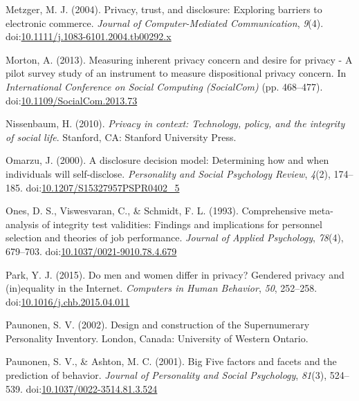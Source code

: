 \documentclass[man,floatsintext]{apa6}
\begin{document}
\leavevmode\hypertarget{ref-Metzger.2004}{}%
Metzger, M. J. (2004). Privacy, trust, and disclosure: Exploring barriers to electronic commerce. \emph{Journal of Computer-Mediated Communication}, \emph{9}(4). doi:\href{https://doi.org/10.1111/j.1083-6101.2004.tb00292.x}{10.1111/j.1083-6101.2004.tb00292.x}

\leavevmode\hypertarget{ref-Morton.2013}{}%
Morton, A. (2013). Measuring inherent privacy concern and desire for privacy - A pilot survey study of an instrument to measure dispositional privacy concern. In \emph{International Conference on Social Computing (SocialCom)} (pp. 468--477). doi:\href{https://doi.org/10.1109/SocialCom.2013.73}{10.1109/SocialCom.2013.73}

\leavevmode\hypertarget{ref-Nissenbaum.2010}{}%
Nissenbaum, H. (2010). \emph{Privacy in context: Technology, policy, and the integrity of social life}. Stanford, CA: Stanford University Press.

\leavevmode\hypertarget{ref-Omarzu.2000}{}%
Omarzu, J. (2000). A disclosure decision model: Determining how and when individuals will self-disclose. \emph{Personality and Social Psychology Review}, \emph{4}(2), 174--185. doi:\href{https://doi.org/10.1207/S15327957PSPR0402_5}{10.1207/S15327957PSPR0402\_5}

\leavevmode\hypertarget{ref-Ones.1993}{}%
Ones, D. S., Viswesvaran, C., \& Schmidt, F. L. (1993). Comprehensive meta-analysis of integrity test validities: Findings and implications for personnel selection and theories of job performance. \emph{Journal of Applied Psychology}, \emph{78}(4), 679--703. doi:\href{https://doi.org/10.1037/0021-9010.78.4.679}{10.1037/0021-9010.78.4.679}

\leavevmode\hypertarget{ref-Park.2015}{}%
Park, Y. J. (2015). Do men and women differ in privacy? Gendered privacy and (in)equality in the Internet. \emph{Computers in Human Behavior}, \emph{50}, 252--258. doi:\href{https://doi.org/10.1016/j.chb.2015.04.011}{10.1016/j.chb.2015.04.011}

\leavevmode\hypertarget{ref-Paunonen.2002}{}%
Paunonen, S. V. (2002). Design and construction of the Supernumerary Personality Inventory. London, Canada: University of Western Ontario.

\leavevmode\hypertarget{ref-Paunonen.2001}{}%
Paunonen, S. V., \& Ashton, M. C. (2001). Big Five factors and facets and the prediction of behavior. \emph{Journal of Personality and Social Psychology}, \emph{81}(3), 524--539. doi:\href{https://doi.org/10.1037/0022-3514.81.3.524}{10.1037/0022-3514.81.3.524}
\end{document}
